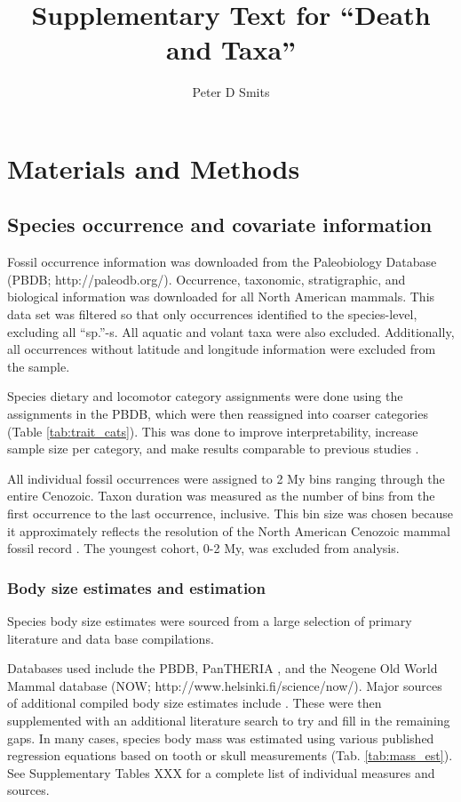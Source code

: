 \documentclass{article}
\title{Supplementary Text for ``Death and Taxa''}
\author{Peter D Smits}
\begin{document}
\maketitle
\linenumbers
\modulolinenumbers[2]

\section{Materials and Methods}

\subsection{Species occurrence and covariate information}
Fossil occurrence information was downloaded from the Paleobiology Database (PBDB; http://paleodb.org/). Occurrence, taxonomic, stratigraphic, and biological information was downloaded for all North American mammals. This data set was filtered so that only occurrences identified to the species-level, excluding all ``sp.''-s. All aquatic and volant taxa were also excluded. Additionally, all occurrences without latitude and longitude information were excluded from the sample.

Species dietary and locomotor category assignments were done using the assignments in the PBDB, which were then reassigned into coarser categories (Table \ref{tab:trait_cats}). This was done to improve interpretability, increase sample size per category, and make results comparable to previous studies \cite{Jernvall2004,Price2012}.

All individual fossil occurrences were assigned to 2 My bins ranging through the entire Cenozoic. Taxon duration was measured as the number of bins from the first occurrence to the last occurrence, inclusive. This bin size was chosen because it approximately reflects the resolution of the North American Cenozoic mammal fossil record \cite{Alroy2009,Alroy2000g,Marcot2014}. The youngest cohort, 0-2 My, was excluded from analysis.


\subsubsection{Body size estimates and estimation}
Species body size estimates were sourced from a large selection of primary literature and data base compilations.

Databases used include the PBDB, PanTHERIA \cite{Jones2009c}, and the Neogene Old World Mammal database (NOW; http://www.helsinki.fi/science/now/). Major sources of additional compiled body size estimates include \cite{Brook2004a,Freudenthal2013,McKenna2011,Raia2012f,Smith2004c,Tomiya2013}. These were then supplemented with an additional literature search to try and fill in the remaining gaps. In many cases, species body mass was estimated using various published regression equations based on tooth or skull measurements (Tab. \ref{tab:mass_est}). See Supplementary Tables XXX for a complete list of individual measures and sources.
\end{document}
